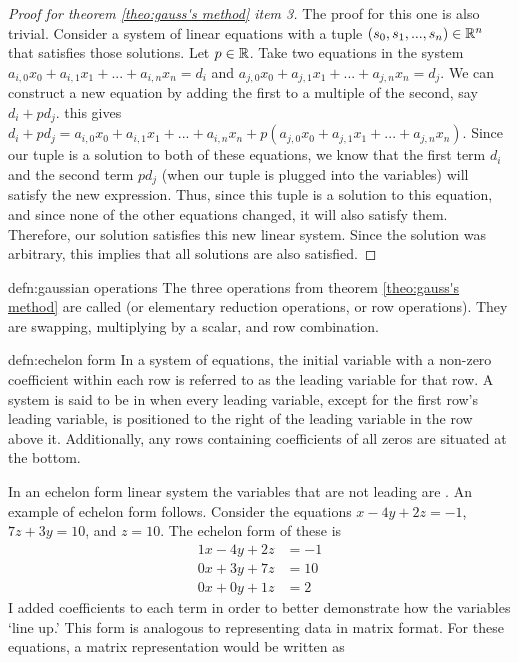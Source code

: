 \begin{proof}[Proof for theorem \ref{theo:gauss's method} item 3]
	The proof for this one is also trivial. Consider a system of linear equations with a tuple $(s_0, s_1,..., s_n) \in{\mathbb R}^n$ that satisfies those solutions. Let $p \in {\mathbb R}$. Take two equations in the system $a_{i,0}x_0 + a_{i,1}x_1 + ... + a_{i,n}x_n = d_i$ and $a_{j,0}x_0 + a_{j,1}x_1 + ... + a_{j,n}x_n = d_j$. We can construct a new equation by adding the first to a multiple of the second, say $d_i + pd_j$. this gives $d_i + pd_j = a_{i,0}x_0 + a_{i,1}x_1 + ... + a_{i,n}x_n + p(a_{j,0}x_0 + a_{j,1}x_1 + ... + a_{j,n}x_n)$. Since our tuple is a solution to both of these equations, we know that the first term $d_i$ and the second term $pd_j$ (when our tuple is plugged into the variables) will satisfy the new expression. Thus, since this tuple is a solution to this equation, and since none of the other equations changed, it will also satisfy them. Therefore, our solution satisfies this new linear system. Since the solution was arbitrary, this implies that all solutions are also satisfied.
\end{proof}

\begin{defn}{defn:gaussian operations}
	The three operations from theorem \ref{theo:gauss's method} are called  (or elementary reduction operations, or row operations). They are swapping, multiplying by a scalar, and row combination.
\end{defn}


\begin{defn}{defn:echelon form}
	In a system of equations, the initial variable with a non-zero coefficient within each row is referred to as the leading variable for that row. A system is said to be in  when every leading variable, except for the first row's leading variable, is positioned to the right of the leading variable in the row above it. Additionally, any rows containing coefficients of all zeros are situated at the bottom. 
\end{defn}


In an echelon form linear system the variables that are not leading are . An example of echelon form follows. Consider the equations $x - 4y + 2z = -1$, $7z + 3y = 10$, and $ z = 10$. The echelon form of these is 
\begin{align}
1x - 4y + 2z &= -1 \\
0x+3y + 7z &= 10 \\
0x+0y+1z &= 2
\end{align}
I added coefficients to each term in order to better demonstrate how the variables `line up.' This form is analogous to representing data in matrix format. For these equations, a matrix representation would be written as

